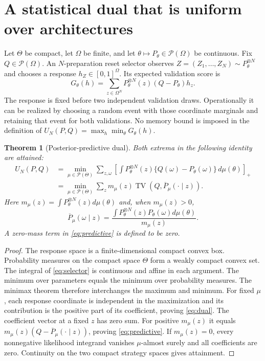 \documentclass[11pt]{amsart}
\newtheorem{theorem}{Theorem}[section]
\theoremstyle{definition}\newtheorem{definition}[theorem]{Definition}
\theoremstyle{remark}\newtheorem{remark}[theorem]{Remark}
\newcommand{\TV}{\operatorname{TV}}
\newcommand{\1}{\mathbf 1}
\newcommand{\cP}{\mathcal P}
\begin{document}
\section{A statistical dual that is uniform over architectures}
\label{sec:dual}
Let $\Theta$ be compact, let $\Omega$ be finite, and let
$\theta\mapsto P_\theta\in\cP(\Omega)$ be continuous. Fix
$Q\in\cP(\Omega)$. An $N$-preparation reset selector observes
$Z=(Z_1,\ldots,Z_N)\sim P_\theta^{\otimes N}$ and chooses a response
$h_Z\in[0,1]^\Omega$. Its expected validation score is
\begin{equation}\label{eq:selector}
 G_\theta(h)=\sum_{z\in\Omega^N}P_\theta^{\otimes N}(z)
                           (Q-P_\theta)h_z.
\end{equation}
The response is fixed before two independent validation draws. Operationally
it can be realized by choosing a random event with those coordinate
marginals and retaining that event for both validations. No memory bound
is imposed in the definition of
$U_N(P,Q)=\max_h\min_\theta G_\theta(h)$.

\begin{theorem}[Posterior-predictive dual]\label{thm:dual}
Both extrema in the following identity are attained:
\begin{align}
 U_N(P,Q)
 &=\min_{\mu\in\cP(\Theta)}
   \sum_{z,\omega}
   \left[\int P_\theta^{\otimes N}(z)
               \{Q(\omega)-P_\theta(\omega)\}\,d\mu(\theta)\right]_+
                                                        \label{eq:dual}\\
 &=\min_{\mu\in\cP(\Theta)}
   \sum_z m_\mu(z)\TV(Q,\overline P_\mu(\cdot\mid z)).
                                                        \label{eq:predictive}
\end{align}
Here $m_\mu(z)=\int P_\theta^{\otimes N}(z)d\mu(\theta)$ and, when
$m_\mu(z)>0$,
\[
 \overline P_\mu(\omega\mid z)
 =\frac{\int P_\theta^{\otimes N}(z)P_\theta(\omega)d\mu(\theta)}
        {m_\mu(z)}.
\]
A zero-mass term in \eqref{eq:predictive} is defined to be zero.
\end{theorem}
\begin{proof}
The response space is a finite-dimensional compact convex box.
Probability measures on the compact space $\Theta$ form a weakly compact
convex set. The integral of \eqref{eq:selector} is continuous and affine
in each argument. The minimum over parameters equals the minimum over
probability measures. The minimax theorem \cite{Sion} therefore interchanges
the maximum and minimum. For fixed $\mu$, each response coordinate is
independent in the maximization and its contribution is the positive part
of its coefficient, proving \eqref{eq:dual}. The coefficient vector at a
fixed $z$ has zero sum. For positive $m_\mu(z)$ it equals
$m_\mu(z)(Q-\overline P_\mu(\cdot\mid z))$, proving
\eqref{eq:predictive}. If $m_\mu(z)=0$, every nonnegative likelihood
integrand vanishes $\mu$-almost surely and all coefficients are zero.
Continuity on the two compact strategy spaces gives attainment.
\end{proof}
\end{document}
